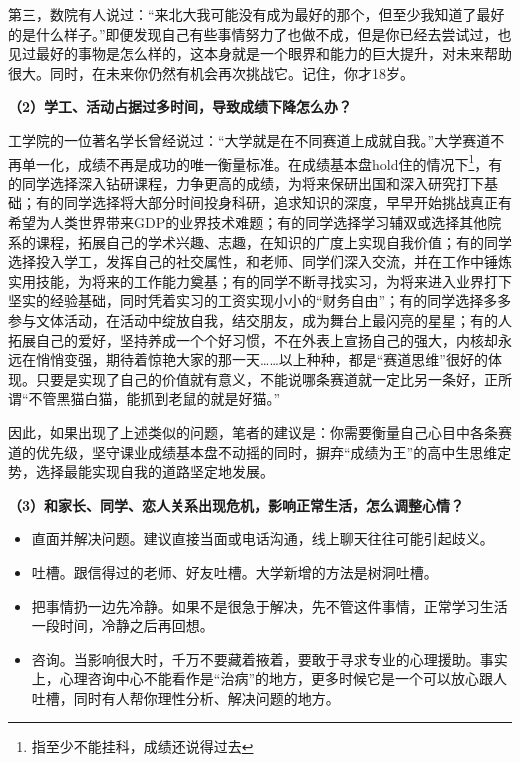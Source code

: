 \documentclass[11pt,oneside]{book}
\begin{document}
\vspace{10pt}

第三，数院有人说过：“来北大我可能没有成为最好的那个，但至少我知道了最好的是什么样子。”即便发现自己有些事情努力了也做不成，但是你已经去尝试过，也见过最好的事物是怎么样的，这本身就是一个眼界和能力的巨大提升，对未来帮助很大。同时，在未来你仍然有机会再次挑战它。记住，你才18岁。

\vspace{10pt}

\textbf{（2）学工、活动占据过多时间，导致成绩下降怎么办？}

\vspace{10pt}

工学院的一位著名学长曾经说过：“大学就是在不同赛道上成就自我。”大学赛道不再单一化，成绩不再是成功的唯一衡量标准。在成绩基本盘hold住的情况下\footnote{指至少不能挂科，成绩还说得过去}，有的同学选择深入钻研课程，力争更高的成绩，为将来保研出国和深入研究打下基础；有的同学选择将大部分时间投身科研，追求知识的深度，早早开始挑战真正有希望为人类世界带来GDP的业界技术难题；有的同学选择学习辅双或选择其他院系的课程，拓展自己的学术兴趣、志趣，在知识的广度上实现自我价值；有的同学选择投入学工，发挥自己的社交属性，和老师、同学们深入交流，并在工作中锤炼实用技能，为将来的工作能力奠基；有的同学不断寻找实习，为将来进入业界打下坚实的经验基础，同时凭着实习的工资实现小小的“财务自由”；有的同学选择多多参与文体活动，在活动中绽放自我，结交朋友，成为舞台上最闪亮的星星；有的人拓展自己的爱好，坚持养成一个个好习惯，不在外表上宣扬自己的强大，内核却永远在悄悄变强，期待着惊艳大家的那一天……以上种种，都是“赛道思维”很好的体现。只要是实现了自己的价值就有意义，不能说哪条赛道就一定比另一条好，正所谓“不管黑猫白猫，能抓到老鼠的就是好猫。”

\vspace{10pt}

因此，如果出现了上述类似的问题，笔者的建议是：你需要衡量自己心目中各条赛道的优先级，坚守课业成绩基本盘不动摇的同时，摒弃“成绩为王”的高中生思维定势，选择最能实现自我的道路坚定地发展。

\vspace{10pt}

\textbf{（3）和家长、同学、恋人关系出现危机，影响正常生活，怎么调整心情？}

\begin{itemize}
	\item 直面并解决问题。建议直接当面或电话沟通，线上聊天往往可能引起歧义。
	\item 吐槽。跟信得过的老师、好友吐槽。大学新增的方法是树洞吐槽。
	\item 把事情扔一边先冷静。如果不是很急于解决，先不管这件事情，正常学习生活一段时间，冷静之后再回想。
	\item 咨询。当影响很大时，千万不要藏着掖着，要敢于寻求专业的心理援助。事实上，心理咨询中心不能看作是“治病”的地方，更多时候它是一个可以放心跟人吐槽，同时有人帮你理性分析、解决问题的地方。
\end{itemize}
\end{document}
